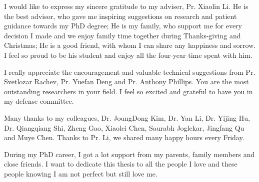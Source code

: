 I would like to express my sincere gratitude to my adviser, Pr. 
Xiaolin Li. He is the best advisor, who gave me inspiring suggestions
on research and patient guidance towards my PhD degree; He is my family, who 
support me for every decision I made and we enjoy family time together 
during Thanks-giving and Christmas; He is a good friend, with whom I can share
any happiness and sorrow. I feel so proud to be his student and enjoy all the
four-year time spent with him.

I really appreciate the encouragement and valuable technical suggestions from
Pr. Svetlozar Rachev, Pr. Yuefan Deng and Pr. Anthony Phillips. 
You are the most outstanding researchers in your field. I feel so
excited and grateful to have you in my defense committee.  

Many thanks to my colleagues, Dr. JoungDong Kim, Dr. Yan Li, 
Dr. Yijing Hu, Dr. Qiangqiang Shi, Zheng Gao, Xiaolei Chen, Saurabh Joglekar, 
Jingfang Qu and Muye Chen. Thanks to Pr. Li, we shared many happy hours
every Friday. 

During my PhD career, I got a lot support from my parents, family 
members and close friends. I want to dedicate this thesis to all the people
I love and these people knowing I am not perfect but still love me.
